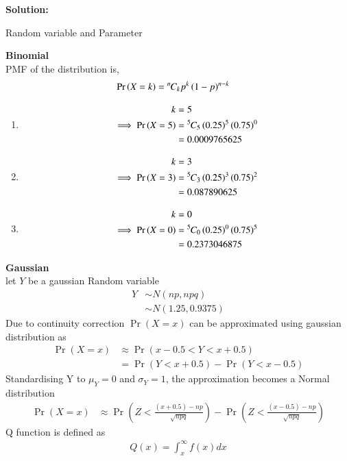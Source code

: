 \documentclass[journal,11pt,onecolumn]{IEEEtran}
\providecommand{\pr}[1]{\ensuremath{\Pr\left(#1\right)}}
\providecommand{\qfunc}[1]{\ensuremath{Q\left(#1\right)}}
\providecommand{\brak}[1]{\ensuremath{\left(#1\right)}}
\newcommand{\solution}{\noindent \textbf{Solution: }}
\providecommand{\pr}[1]{\ensuremath{\Pr\left(#1\right)}}
\providecommand{\qfunc}[1]{\ensuremath{Q\left(#1\right)}}
\newcommand*{\permcomb}[4][0mu]{{{}^{#3}\mkern#1#2_{#4}}}
\newcommand*{\comb}[1][-1mu]{\permcomb[#1]{C}}
\providecommand{\qfunc}[1]{\ensuremath{Q\left(#1\right)}}
\begin{document}
\solution\\
\begin{table}[ht!]
	\centering
	
	\caption{Random variable and Parameter}
	\label{tab:gausstab2_9.3.3}
\end{table}
\textbf{Binomial}\\
PMF of the distribution is,
\begin{align}
	\pr{X=k}&=\comb{n}{k}p^k\brak{1-p}^{n-k}
\end{align}
\begin{enumerate}
	\item
	\begin{align}
	k&=5\\
	\implies \pr{X=5}&=\comb{5}{5}\brak{0.25}^5\brak{0.75}^0\\
	&=0.0009765625
\end{align}
	\item
	\begin{align}
	k&=3\\
	\implies\pr{X=3}&=\comb{5}{3}\brak{0.25}^3\brak{0.75}^2\\
	&=0.087890625
\end{align}
	\item
	\begin{align}
	k&=0\\
	\implies\pr{X=0}&=\comb{5}{0}\brak{0.25}^0\brak{0.75}^5\\
	&=0.2373046875
\end{align}
\end{enumerate}
\textbf{Gaussian}\\
let $Y$ be a gaussian Random variable
\begin{align}
	Y &\sim N\brak{np,npq}\\
	&\sim N\brak{1.25,0.9375}
\end{align}
Due to continuity correction \pr{X=x} can be approximated using gaussian distribution as
\begin{align}
	\pr{X=x}&\approx\pr{x-0.5<Y<x+0.5}\\
	&=\pr{Y<x+0.5}-\pr{Y<x-0.5}	
\end{align}
Standardising Y to $\mu_Y=0$ and $\sigma_Y=1$, the approximation becomes a Normal distribution
\begin{align}
	\pr{X=x}&\approx \pr{Z<\frac{\brak{x+0.5}-np}{\sqrt{npq}}}-\pr{Z<\frac{\brak{x-0.5}-np}{\sqrt{npq}}}
\end{align}
Q function is defined as
\begin{align}
	\qfunc{x}=\int_x^{\infty}f\brak{x}dx
\end{align}
\end{document}
